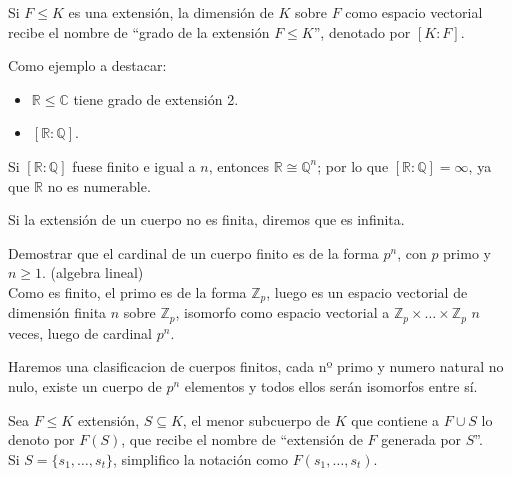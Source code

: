 \begin{definicion}
    Si $F\leq K$ es una extensión, la dimensión de $K$ sobre $F$ como espacio vectorial recibe el nombre de ``grado de la extensión $F\leq K$'', denotado por $[K:F]$.
\end{definicion}

\begin{ejemplo}
    Como ejemplo a destacar:
    \begin{itemize}
        \item $\mathbb{R}\leq \mathbb{C}$ tiene grado de extensión 2.
        \item $[\mathbb{R}:\mathbb{Q}]$.
    \end{itemize}
    Si $[\mathbb{R}:\mathbb{Q}]$ fuese finito e igual a $n$, entonces $\mathbb{R}\cong \mathbb{Q}^n$; por lo que $[\mathbb{R}:\mathbb{Q}] = \infty$, ya que $\mathbb{R}$ no es numerable.
\end{ejemplo}

\begin{notacion}
    Si la extensión de un cuerpo no es finita, diremos que es infinita.
\end{notacion}

\begin{ejercicio}
    Demostrar que el cardinal de un cuerpo finito es de la forma $p^n$, con $p$ primo y $n\geq 1$. (algebra lineal)\\

    \noindent
    Como es finito, el primo es de la forma $\mathbb{Z}_p$, luego es un espacio vectorial de dimensión finita $n$ sobre $\mathbb{Z}_p$, isomorfo como espacio vectorial a $\mathbb{Z}_p\times \ldots \times \mathbb{Z}_p$ $n$ veces, luego de cardinal $p^n$.
\end{ejercicio}

Haremos una clasificacion de cuerpos finitos, cada nº primo y numero natural no nulo, existe un cuerpo de $p^n$ elementos y todos ellos serán isomorfos entre sí.

\begin{notacion}
    Sea $F\leq K$ extensión, $S\subseteq K$, el menor subcuerpo de $K$ que contiene a $F\cup S$ lo denoto por $F(S)$, que recibe el nombre de ``extensión de $F$ generada por $S$''.\\

    \noindent
    Si $S = \{s_1,\ldots,s_t\}$, simplifico la notación como $F(s_1,\ldots,s_t)$.
\end{notacion}

